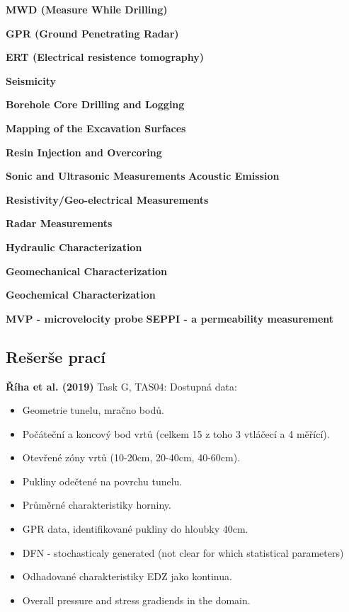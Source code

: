 \documentclass{article}
\begin{document}
{\bf MWD (Measure While Drilling)} \cite{JeroenvanEldert2018}

{\bf GPR (Ground Penetrating Radar)} 

{\bf ERT (Electrical resistence tomography)}


{\bf Seismicity}

{\bf  Borehole Core Drilling and Logging} \cite{Lanyon2011}

{\bf Mapping of the Excavation Surfaces} \cite{Lanyon2011}

{\bf  Resin Injection and Overcoring} \cite{Lanyon2011}

{\bf  Sonic and Ultrasonic Measurements} \cite{Lanyon2011}
{\bf  Acoustic Emission} \cite{Lanyon2011}

{\bf  Resistivity/Geo-electrical Measurements} \cite{Lanyon2011}

{\bf  Radar Measurements} \cite{Lanyon2011}

{\bf  Hydraulic Characterization} \cite{Lanyon2011}

{\bf  Geomechanical Characterization} \cite{Lanyon2011}

{\bf  Geochemical Characterization} \cite{Lanyon2011}

{\bf MVP - microvelocity probe} \cite{Rutqvist2009} 
{\bf SEPPI - a permeability measurement} \cite{Rutqvist2009} 


\subsection{Rešerše prací}

{\bf Říha et al. (2019)} Task G, TAS04: Dostupná data: 
\begin{itemize}
    \item Geometrie tunelu, mračno bodů.
    \item Počáteční a koncový bod vrtů (celkem 15 z toho 3 vtláčecí a 4 měřící).
    \item Otevřené zóny vrtů (10-20cm, 20-40cm, 40-60cm).
    \item Pukliny odečtené na povrchu tunelu.
    \item Průměrné charakteristiky horniny.
    \item GPR data, identifikované pukliny do hloubky 40cm.
    \item DFN - stochasticaly generated (not clear for which statistical parameters)
    \item Odhadované charakteristiky EDZ jako kontinua.
    \item Overall pressure and stress gradiends in the domain.
\end{itemize}
\end{document}
